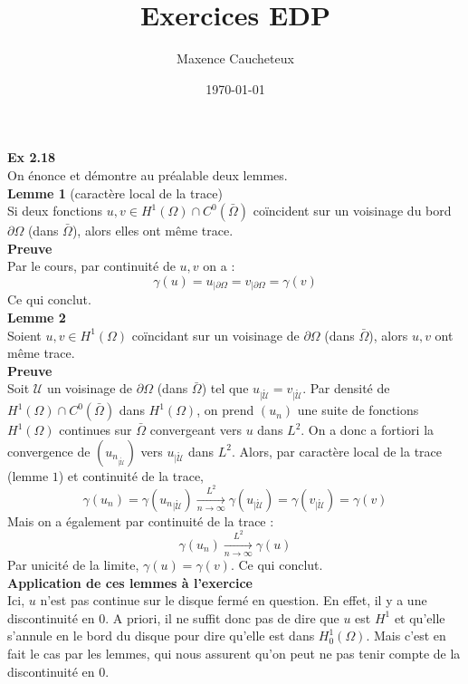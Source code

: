 \documentclass[a4paper,12pt]{article}
\title{Exercices EDP}
\author{Maxence Caucheteux}
\date{\today}
\newcommand{\Hun}{H^1(\Omega)}
\newcommand{\vois}{\mathring{\mathcal{U}}}
\begin{document}
\maketitle

\textbf{Ex 2.18} \\
On énonce et démontre au préalable deux lemmes. \\

\textbf{Lemme 1} (caractère local de la trace) \\
Si deux fonctions $u,v \in \Hun \cap C^0(\bar{\Omega})$ coïncident sur un voisinage du bord $\partial \Omega$ (dans $\bar{\Omega}$), alors elles ont même trace. \\

\textbf{Preuve} \\
Par le cours, par continuité de $u,v$ on a :
$$\boxed{\gamma(u)=u_{|\partial \Omega} = v_{|\partial \Omega} = \gamma(v)}$$
Ce qui conclut. \\

\textbf{Lemme 2} \\
Soient $u,v \in \Hun$ coïncidant sur un voisinage de $\partial \Omega$ (dans $\bar{\Omega}$), alors $u,v$ ont même trace. \\

\textbf{Preuve} \\ 
Soit $\mathcal{U}$ un voisinage de $\partial \Omega$ (dans $\bar{\Omega}$) tel que $u_{| \vois} = v_{| \vois}$. Par densité de $\Hun \cap C^0(\bar{\Omega})$ dans $H^1(\Omega)$, on prend $(u_n)$ une suite de fonctions $\Hun$ continues sur $\bar{\Omega}$ convergeant vers $u$ dans $L^2$. On a donc a fortiori la convergence de $(u_n_{| \vois})$ vers $u_{| \vois}$ dans $L^2$. Alors, par caractère local de la trace (lemme $1$) et continuité de la trace, 
$$\gamma(u_n)=\gamma({u_n}_{| \vois}) \xrightarrow[n \rightarrow \infty]{L^2} \gamma(u_{| \vois}) = \gamma(v_{| \vois}) = \gamma(v)$$
Mais on a également par continuité de la trace :
$$\gamma(u_n) \xrightarrow[n \rightarrow \infty]{L^2} \gamma(u)$$
Par unicité de la limite, $\boxed{\gamma(u)=\gamma(v)}$. Ce qui conclut. \\

\textbf{Application de ces lemmes à l'exercice} \\
Ici, $u$ n'est pas continue sur le disque fermé en question. En effet, il y a une discontinuité en $0$. A priori, il ne suffit donc pas de dire que $u$ est $H^1$ et qu'elle s'annule en le bord du disque pour dire qu'elle est dans $H^1_0(\Omega)$. Mais c'est en fait le cas par les lemmes, qui nous assurent qu'on peut ne pas tenir compte de la discontinuité en $0$. \\
\end{document}
